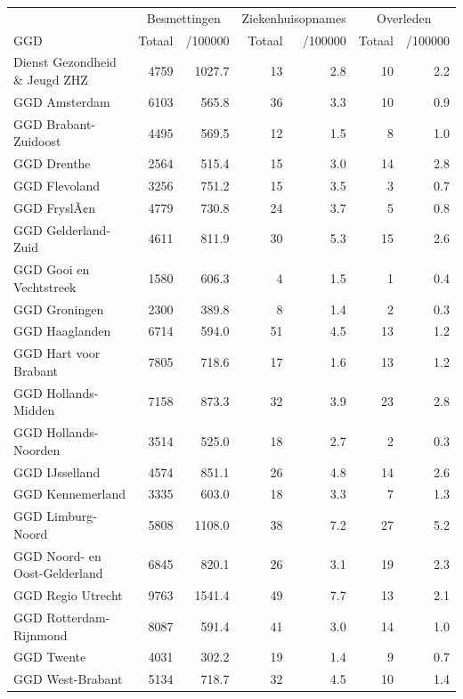 \documentclass[
  english,
  man,floatsintext]{apa6}
\begin{document}
\begin{table}
\centering\begingroup\fontsize{10}{12}\selectfont

\begin{threeparttable}
\begin{tabular}{lrrrrrr}
\toprule
\multicolumn{1}{c}{ } & \multicolumn{2}{c}{Besmettingen} & \multicolumn{2}{c}{Ziekenhuisopnames} & \multicolumn{2}{c}{Overleden} \\
\cmidrule(l{3pt}r{3pt}){2-3} \cmidrule(l{3pt}r{3pt}){4-5} \cmidrule(l{3pt}r{3pt}){6-7}
GGD & Totaal & /100000 & Totaal & /100000 & Totaal & /100000\\
\midrule
Dienst Gezondheid \& Jeugd ZHZ & 4759 & 1027.7 & 13 & 2.8 & 10 & 2.2\\
GGD Amsterdam & 6103 & 565.8 & 36 & 3.3 & 10 & 0.9\\
GGD Brabant-Zuidoost & 4495 & 569.5 & 12 & 1.5 & 8 & 1.0\\
GGD Drenthe & 2564 & 515.4 & 15 & 3.0 & 14 & 2.8\\
GGD Flevoland & 3256 & 751.2 & 15 & 3.5 & 3 & 0.7\\
GGD FryslÃ¢n & 4779 & 730.8 & 24 & 3.7 & 5 & 0.8\\
GGD Gelderland-Zuid & 4611 & 811.9 & 30 & 5.3 & 15 & 2.6\\
GGD Gooi en Vechtstreek & 1580 & 606.3 & 4 & 1.5 & 1 & 0.4\\
GGD Groningen & 2300 & 389.8 & 8 & 1.4 & 2 & 0.3\\
GGD Haaglanden & 6714 & 594.0 & 51 & 4.5 & 13 & 1.2\\
GGD Hart voor Brabant & 7805 & 718.6 & 17 & 1.6 & 13 & 1.2\\
GGD Hollands-Midden & 7158 & 873.3 & 32 & 3.9 & 23 & 2.8\\
GGD Hollands-Noorden & 3514 & 525.0 & 18 & 2.7 & 2 & 0.3\\
GGD IJsselland & 4574 & 851.1 & 26 & 4.8 & 14 & 2.6\\
GGD Kennemerland & 3335 & 603.0 & 18 & 3.3 & 7 & 1.3\\
GGD Limburg-Noord & 5808 & 1108.0 & 38 & 7.2 & 27 & 5.2\\
GGD Noord- en Oost-Gelderland & 6845 & 820.1 & 26 & 3.1 & 19 & 2.3\\
GGD Regio Utrecht & 9763 & 1541.4 & 49 & 7.7 & 13 & 2.1\\
GGD Rotterdam-Rijnmond & 8087 & 591.4 & 41 & 3.0 & 14 & 1.0\\
GGD Twente & 4031 & 302.2 & 19 & 1.4 & 9 & 0.7\\
GGD West-Brabant & 5134 & 718.7 & 32 & 4.5 & 10 & 1.4\\

\end{tabular}
\end{threeparttable}
\end{table}
\end{document}
